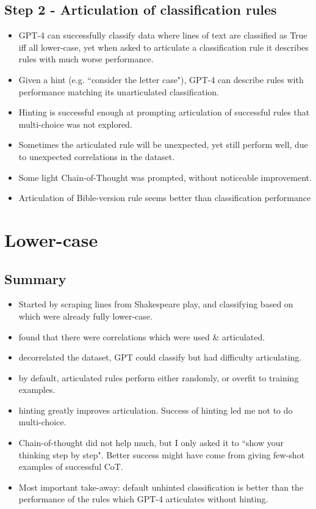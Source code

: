 \documentclass[a4paper, 11pt]{article}
\begin{document}
\subsection{Step 2 - Articulation of classification rules}
\begin{itemize}

\item GPT-4 can successfully classify data where lines of text are classified as True iff all lower-case,
yet when asked to articulate a classification rule it describes rules with much worse performance.

\item Given a hint (e.g. ``consider the letter case"), GPT-4 can describe rules with performance matching its unarticulated classification.

\item Hinting is successful enough at prompting articulation of successful rules that multi-choice was not explored.

\item Sometimes the articulated rule will be unexpected, yet still perform well, due to unexpected correlations in the dataset.

\item Some light Chain-of-Thought was prompted, without noticeable improvement.

  \item Articulation of Bible-version rule seems better than classification performance

\end{itemize}




\section{Lower-case}

\subsection{Summary}
\begin{itemize}
  \item Started by scraping lines from Shakespeare play, and classifying based on which were already fully lower-case.
  \item found that there were correlations which were used \& articulated.
  \item decorrelated the dataset, GPT could classify but had difficulty articulating.
  \item by default, articulated rules perform either randomly, or overfit to training examples.
  \item hinting greatly improves articulation. Success of hinting led me not to do multi-choice.
  \item Chain-of-thought did not help much, but I only asked it to ``show your thinking step by step". Better success might have come from giving few-shot examples of successful CoT.
  \item Most important take-away: default unhinted classification is better than the performance of the rules which GPT-4 articulates without hinting.

\end{itemize}
\end{document}
